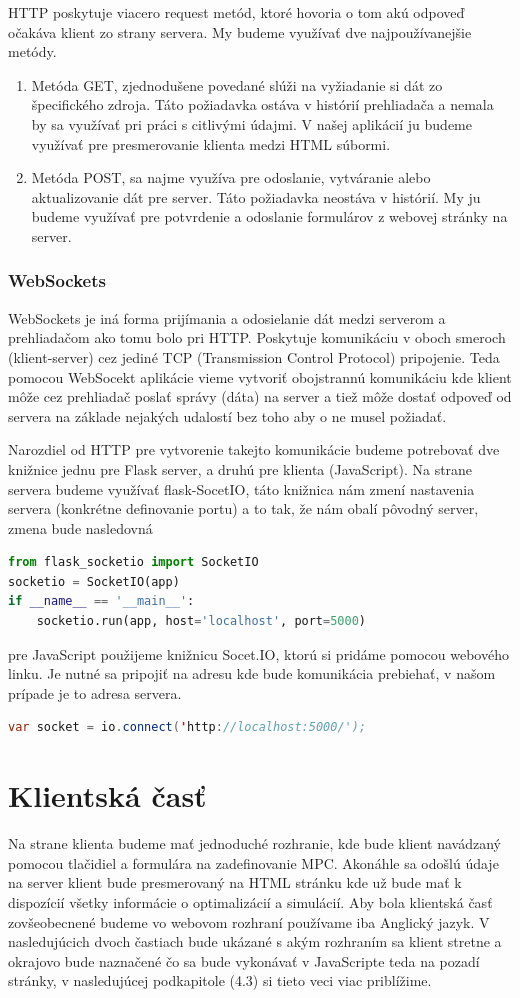 HTTP poskytuje viacero request metód, ktoré hovoria o tom akú odpoveď očakáva klient zo strany servera. My budeme využívať dve najpoužívanejšie metódy.
\begin{enumerate}
\item { Metóda GET, zjednodušene povedané slúži na vyžiadanie si dát zo špecifického zdroja. Táto požiadavka ostáva v histórií prehliadača a nemala by sa využívať pri práci s citlivými údajmi. V našej aplikácií ju budeme využívať pre presmerovanie klienta medzi HTML súbormi.  
}
\item { Metóda POST, sa najme využíva pre odoslanie, vytváranie alebo aktualizovanie dát pre server. Táto požiadavka neostáva v histórií. My ju budeme využívať pre potvrdenie a odoslanie formulárov z webovej stránky na server.  
}
\end{enumerate}

\subsubsection{WebSockets}
WebSockets je iná forma prijímania a odosielanie dát medzi serverom a prehliadačom ako tomu bolo pri HTTP. Poskytuje komunikáciu v oboch smeroch (klient-server) cez jediné TCP (Transmission Control Protocol) pripojenie. Teda pomocou WebSocekt aplikácie vieme vytvoriť obojstrannú komunikáciu kde klient môže cez prehliadač poslať správy (dáta) na server a tiež môže dostať odpoveď od servera na základe nejakých udalostí bez toho aby o ne musel požiadať.

Narozdiel od HTTP pre vytvorenie takejto komunikácie budeme potrebovať dve knižnice jednu pre Flask server, a druhú pre klienta (JavaScript). Na strane servera budeme využívať flask-SocetIO, táto knižnica nám zmení nastavenia servera (konkrétne definovanie portu) a to tak, že nám obalí pôvodný server, zmena bude nasledovná
\begin{lstlisting}[language=Python]
from flask_socketio import SocketIO
socketio = SocketIO(app)
if __name__ == '__main__':
	socketio.run(app, host='localhost', port=5000)
\end{lstlisting}
pre JavaScript použijeme knižnicu Socet.IO, ktorú si pridáme pomocou webového linku. Je nutné sa pripojiť na adresu kde bude komunikácia prebiehať, v našom prípade je to adresa servera.
\begin{lstlisting}[language=Java]
var socket = io.connect('http://localhost:5000/');
\end{lstlisting}

\section{Klientská časť}
Na strane klienta budeme mať jednoduché rozhranie, kde bude klient navádzaný pomocou tlačidiel a formulára na zadefinovanie MPC. Akonáhle sa odošlú údaje na server klient bude presmerovaný na HTML stránku kde už bude mať k dispozícií všetky informácie o optimalizácií a simulácií. Aby bola klientská časť zovšeobecnené budeme vo webovom rozhraní používame iba Anglický jazyk. V nasledujúcich dvoch častiach bude ukázané s akým rozhraním sa klient stretne a okrajovo bude naznačené čo sa bude vykonávať v JavaScripte teda na pozadí stránky, v nasledujúcej podkapitole (4.3) si tieto veci viac priblížime. 
